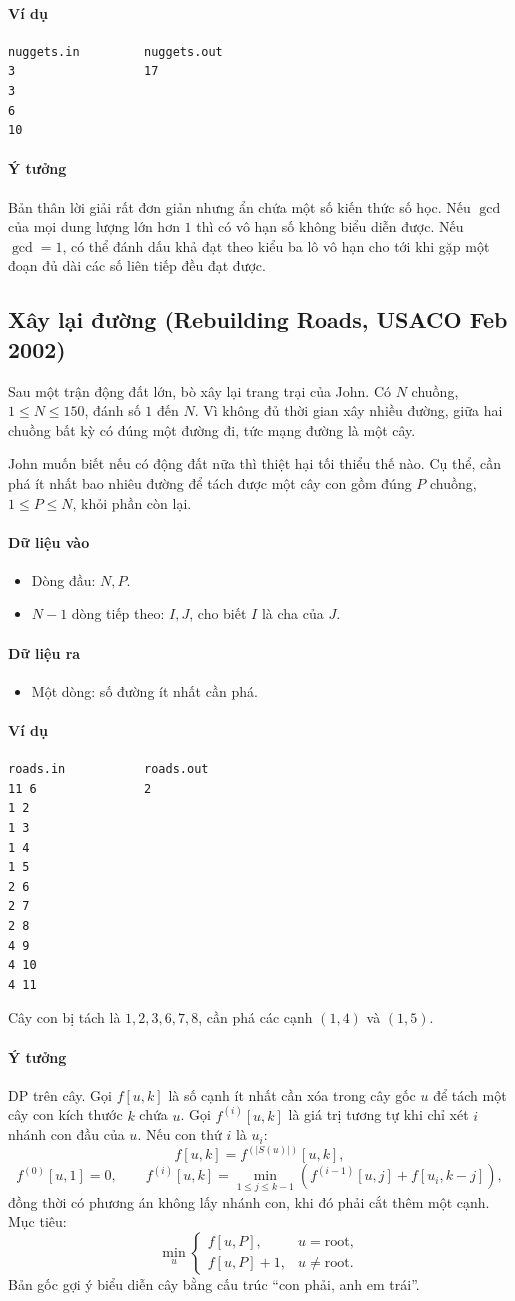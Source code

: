 \documentclass[11pt]{article}
\newcommand{\problem}[1]{\subsection{#1}}
\newcommand{\iosec}[1]{\paragraph{#1}}
\begin{document}
\iosec{Ví dụ}
\begin{verbatim}
nuggets.in         nuggets.out
3                  17
3
6
10
\end{verbatim}

\iosec{Ý tưởng}
Bản thân lời giải rất đơn giản nhưng ẩn chứa một số kiến thức số học. Nếu \(\gcd\) của mọi dung lượng lớn hơn \(1\) thì có vô hạn số không biểu diễn được. Nếu \(\gcd=1\), có thể đánh dấu khả đạt theo kiểu ba lô vô hạn cho tới khi gặp một đoạn đủ dài các số liên tiếp đều đạt được.

\problem{Xây lại đường (Rebuilding Roads, USACO Feb 2002)}

Sau một trận động đất lớn, bò xây lại trang trại của John. Có \(N\) chuồng, \(1 \le N \le 150\), đánh số \(1\) đến \(N\). Vì không đủ thời gian xây nhiều đường, giữa hai chuồng bất kỳ có đúng một đường đi, tức mạng đường là một cây.

John muốn biết nếu có động đất nữa thì thiệt hại tối thiểu thế nào. Cụ thể, cần phá ít nhất bao nhiêu đường để tách được một cây con gồm đúng \(P\) chuồng, \(1 \le P \le N\), khỏi phần còn lại.

\iosec{Dữ liệu vào}
\begin{itemize}
  \item Dòng đầu: \(N,P\).
  \item \(N-1\) dòng tiếp theo: \(I,J\), cho biết \(I\) là cha của \(J\).
\end{itemize}

\iosec{Dữ liệu ra}
\begin{itemize}
  \item Một dòng: số đường ít nhất cần phá.
\end{itemize}

\iosec{Ví dụ}
\begin{verbatim}
roads.in           roads.out
11 6               2
1 2
1 3
1 4
1 5
2 6
2 7
2 8
4 9
4 10
4 11
\end{verbatim}

Cây con bị tách là \(1,2,3,6,7,8\), cần phá các cạnh \((1,4)\) và \((1,5)\).

\iosec{Ý tưởng}
DP trên cây. Gọi \(f[u,k]\) là số cạnh ít nhất cần xóa trong cây gốc \(u\) để tách một cây con kích thước \(k\) chứa \(u\). Gọi \(f^{(i)}[u,k]\) là giá trị tương tự khi chỉ xét \(i\) nhánh con đầu của \(u\). Nếu con thứ \(i\) là \(u_i\):
\[
  f[u,k]=f^{(|S(u)|)}[u,k],
\]
\[
  f^{(0)}[u,1]=0,\qquad
  f^{(i)}[u,k]=\min_{1\le j\le k-1}
  \left(f^{(i-1)}[u,j]+f[u_i,k-j]\right),
\]
đồng thời có phương án không lấy nhánh con, khi đó phải cắt thêm một cạnh. Mục tiêu:
\[
  \min_u
  \begin{cases}
    f[u,P], & u=\text{root},\\
    f[u,P]+1, & u\ne\text{root}.
  \end{cases}
\]
Bản gốc gợi ý biểu diễn cây bằng cấu trúc ``con phải, anh em trái''.
\end{document}
